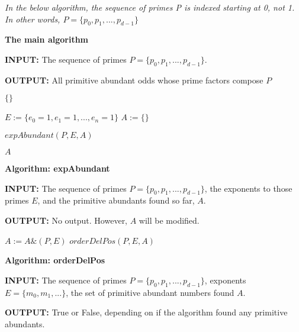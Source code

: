 \documentclass[../paper.tex]{subfiles}
\begin{document}

\textit{In the below algorithm, the sequence of primes P is indexed 
starting at 0, not 1. In other words, $P = \{p_0, p_1, ..., p_{d-1}\}$}

%

{\setlength{\parindent}{0cm}

\textbf{The main algorithm}

\textbf{INPUT:} The sequence of primes 
$P = \{p_0, p_1, ..., p_{d-1}\}$.

\textbf{OUTPUT:} All primitive abundant odds whose prime factors
compose $P$

}


\begin{algorithmic}
  \RETURN $\{\}$
\ENDIF

\STATE $E := \{e_0 = 1,e_1 = 1,...,e_n = 1\}$
\STATE $A := \{ \}$ %

\STATE $expAbundant(P, E, A)$

\RETURN $A$

\end{algorithmic}

{\setlength{\parindent}{0cm}

\textbf{Algorithm: expAbundant}

\textbf{INPUT:} The sequence of primes 
$P = \{p_0, p_1, ..., p_{d-1}\}$, the exponents to those 
primes $E$, and the primitive abundants found so far, $A$.

\textbf{OUTPUT:} No output. However, $A$ will be modified.
}

\begin{algorithmic}
		\STATE $A := A \& (P,E)$
		\RETURN
	\ENDIF
	\RETURN
\ENDIF
$orderDelPos(P,E,A)$
\RETURN

\end{algorithmic}

{\setlength{\parindent}{0cm}

\textbf{Algorithm: orderDelPos}

\textbf{INPUT:} The sequence of primes 
$P = \{p_0, p_1, ..., p_{d-1}\}$, exponents $E = \{ m_0, m_1,
...\}$, the set of primitive abundant numbers found $A$.

\textbf{OUTPUT:} True or False, depending on if the algorithm found any primitive abundants.
}
\end{document}
